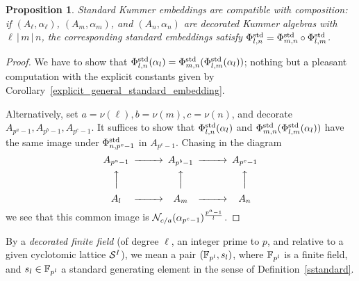 \documentclass{sig-alternate}
\newtheorem{proposition}[theorem]{Proposition}
\begin{document}
\begin{proposition}
\label{standard_K_embeddings_compatibles}
Standard Kummer embeddings are compatible with composition:
if $(A_\ell,\alpha_\ell)$, $(A_m,\alpha_m)$, and $(A_n,\alpha_n)$ are decorated Kummer algebras
with $\ell\,|\,m\,|\,n$, the corresponding standard embeddings
satisfy ${\Phi^{\mathrm{std}}_{{l},{n}}}={\Phi^{\mathrm{std}}_{{m},{n}}}\circ{\Phi^{\mathrm{std}}_{{l},{m}}}$.
\end{proposition}
\begin{proof}
We have to show that ${\Phi^{\mathrm{std}}_{{l},{n}}}(\alpha_l)={\Phi^{\mathrm{std}}_{{m},{n}}}({\Phi^{\mathrm{std}}_{{l},{m}}}(\alpha_l))$;
nothing but a pleasant computation with the explicit constants given 
by Corollary~\ref{explicit_general_standard_embedding}.

Alternatively, set $a=\nu(\ell),b=\nu(m),c=\nu(n)$, and decorate $A_{p^a-1},A_{p^b-1},A_{p^c-1}$.
It suffices to show that ${\Phi^{\mathrm{std}}_{{l},{n}}}(\alpha_l)$
and ${\Phi^{\mathrm{std}}_{{m},{n}}}({\Phi^{\mathrm{std}}_{{l},{m}}}(\alpha_l))$ have the same image under ${\Phi^{\mathrm{std}}_{{n},{p^c-1}}}$
in $A_{p^c-1}$.
Chasing in the diagram
\begin{equation*}
\begin{CD}
A_{p^a-1} @>>> A_{p^b-1} @>>> A_{p^c-1} \\
@AAA @AAA @AAA\\
A_\ell @>>> A_m @>>> A_n
\end{CD}
\end{equation*}
we see that this common image
is $\mathcal{N}_{c/a}(\alpha_{p^c-1})^{\frac{p^a-1}{l}}$.
\end{proof}

By a \emph{decorated finite field} (of degree $\ell$, an integer prime to $p$,
and relative to a given cyclotomic lattice $\mathcal{S}^{I}$),
we mean a pair $(\mathbb{F}_{p^l},s_l)$,
where $\mathbb{F}_{p^l}$ is a finite field,
and $s_l\in\mathbb{F}_{p^l}$ a standard generating element
in the sense of Definition~\ref{sstandard}.
\end{document}
